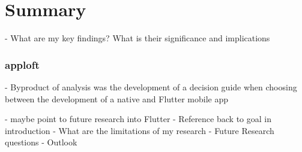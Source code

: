\chapter{Summary}
- What are my key findings? What is their significance and implications

\subsection{apploft}
- Byproduct of analysis was the development of a decision guide when choosing
between the development of a native and Flutter mobile app

- maybe point to future research into Flutter
- Reference back to goal in introduction
- What are the limitations of my research
- Future Research questions
- Outlook
